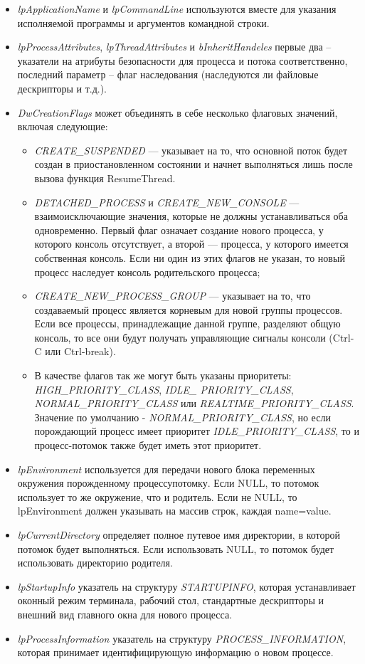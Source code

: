 \documentclass[14pt,a4paper,report]{report}
\begin{document}
\begin{itemize}
	\item \emph{lpApplicationName} и \emph{lpCommandLine} используются вместе для указания исполняемой программы и аргументов командной строки.
	\item \emph{lpProcessAttributes}, \emph{lpThreadAttributes} и \emph{bInheritHandeles} первые два – указатели на атрибуты безопасности для процесса и потока соответственно, последний параметр – флаг наследования (наследуются ли файловые дескрипторы и т.д.).
	\item \emph{DwCreationFlags} может объединять в себе несколько флаговых значений, включая следующие:
	\begin{itemize}
		\item \emph{CREATE\_SUSPENDED} — указывает на то, что основной поток будет создан в приостановленном состоянии и начнет выполняться лишь после вызова функция ResumeThread.
		\item \emph{DETACHED\_PROCESS} и \emph{CREATE\_NEW\_CONSOLE} — взаимоисключающие значения, которые не должны устанавливаться оба одновременно. Первый флаг означает создание нового процесса, у которого консоль отсутствует, а второй — процесса, у которого имеется собственная консоль. Если ни один из этих флагов не указан, то новый процесс наследует консоль родительского процесса;
		\item \emph{CREATE\_NEW\_PROCESS\_GROUP} — указывает на то, что создаваемый процесс является корневым для новой группы процессов. Если все процессы, принадлежащие данной группе, разделяют общую консоль, то все они будут получать управляющие сигналы консоли (Ctrl-C или Ctrl-break).
		\item В качестве флагов так же могут быть указаны приоритеты: \emph{HIGH\_PRIORITY\_CLASS}, \emph{IDLE\_ PRIORITY\_CLASS}, \emph{NORMAL\_PRIORITY\_CLASS} или \emph{REALTIME\_PRIORITY\_CLASS}. Значение по умолчанию - \emph{NORMAL\_PRIORITY\_CLASS}, но если порождающий процесс имеет приоритет \emph{IDLE\_PRIORITY\_CLASS}, то и процесс-потомок также будет иметь этот приоритет.
	\end{itemize}
	\item \emph{lpEnvironment} используется для передачи нового блока переменных окружения порожденному процессупотомку. Если NULL, то потомок использует то же окружение, что и родитель. Если не NULL, то lpEnvironment должен указывать на массив строк, каждая name=value.
	\item \emph{lpCurrentDirectory} определяет полное путевое имя директории, в которой потомок будет выполняться. Если использовать NULL, то потомок будет использовать директорию родителя.
	\item \emph{lpStartupInfo} указатель на структуру \emph{STARTUPINFO}, которая устанавливает оконный режим терминала, рабочий стол, стандартные дескрипторы и внешний вид главного окна для нового процесса.
	\item \emph{lpProcessInformation} указатель на структуру \emph{PROCESS\_INFORMATION}, которая принимает идентифицирующую информацию о новом процессе.
\end{itemize}
\end{document}
